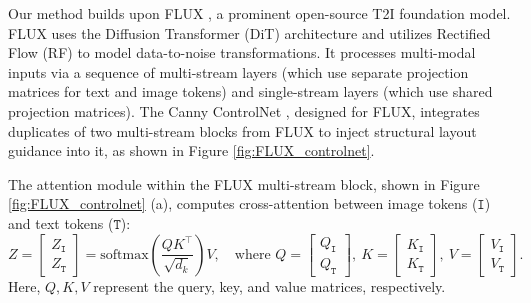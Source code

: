 \documentclass{article}
\begin{document}
Our method builds upon FLUX \citep{blackforest2024FLUX}, a prominent open-source T2I foundation model. FLUX uses the Diffusion Transformer (DiT) architecture \citep{peebles2023scalable} and utilizes Rectified Flow (RF) \citep{liu2022flow} to model data-to-noise transformations. It processes multi-modal inputs via a sequence of multi-stream layers (which use separate projection matrices for text and image tokens) and single-stream layers (which use shared projection matrices). The Canny ControlNet \citep{xlabsai2025fluxcontrolnet}, designed for FLUX, integrates duplicates of two multi-stream blocks from FLUX to inject structural layout guidance into it, as shown in Figure \ref{fig:FLUX_controlnet}.


The attention module within the FLUX multi-stream block, shown in Figure \ref{fig:FLUX_controlnet} (a), computes cross-attention between image tokens ($\texttt{I}$) and text tokens ($\texttt{T}$):
\begin{equation}
Z = \begin{bmatrix} Z_\texttt{I}\\Z_\texttt{T}\end{bmatrix} = \mathrm{softmax}\left(\frac{Q K^\top}{\sqrt{d_k}}\right)V,\quad \text{where }
Q = \begin{bmatrix}Q_\texttt{I}\\Q_\texttt{T}\end{bmatrix},\ 
K = \begin{bmatrix}K_\texttt{I}\\K_\texttt{T}\end{bmatrix},\ 
V = \begin{bmatrix}V_\texttt{I}\\V_\texttt{T}\end{bmatrix}.\ 
\label{eq:FLUX_attention}
\end{equation}
Here, $Q, K, V$ represent the query, key, and value matrices, respectively.
\end{document}
